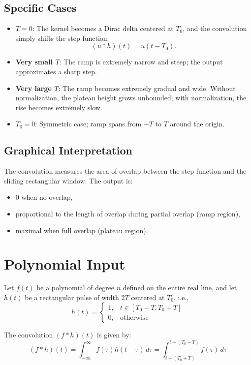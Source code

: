 \documentclass[12pt,a4paper]{report}
\begin{document}
\subsection{Specific Cases}

\begin{itemize}
    \item \textbf{$T=0$}: The kernel becomes a Dirac delta centered at $T_0$, and the convolution simply shifts the step function:
    \[
    (u * h)(t) = u(t - T_0).
    \]
    \item \textbf{Very small $T$}: The ramp is extremely narrow and steep; the output approximates a sharp step.
    \item \textbf{Very large $T$}: The ramp becomes extremely gradual and wide. Without normalization, the plateau height grows unbounded; with normalization, the rise becomes extremely slow.
    \item \textbf{$T_0=0$}: Symmetric case; ramp spans from $-T$ to $T$ around the origin.
\end{itemize}
\subsection{Graphical Interpretation}

The convolution measures the area of overlap between the step function and the sliding rectangular window.  
The output is:
\begin{itemize}
    \item $0$ when no overlap,
    \item proportional to the length of overlap during partial overlap (ramp region),
    \item maximal when full overlap (plateau region).
\end{itemize}
\section{Polynomial Input}

Let $f(t)$ be a polynomial of degree $n$ defined on the entire real line, and let $h(t)$ be a rectangular pulse of width $2T$ centered at $T_0$, i.e.,
\[
h(t) = \begin{cases}
1, & t \in [T_0 - T, T_0 + T] \\
0, & \text{otherwise}
\end{cases}
\]

The convolution $(f * h)(t)$ is given by:
\[
(f * h)(t) = \int_{-\infty}^{\infty} f(\tau) h(t - \tau)\,d\tau = \int_{t - (T_0 + T)}^{t - (T_0 - T)} f(\tau)\, d\tau
\]
\end{document}
